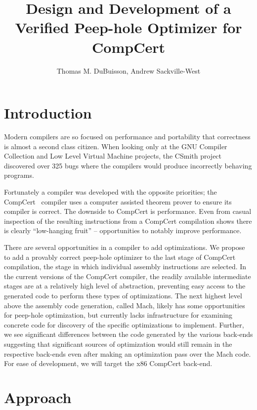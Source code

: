 \documentclass[letterpaper]{article}
\begin{document}
\title{Design and Development of a Verified Peep-hole Optimizer for CompCert}

\author{Thomas M. Du{B}uisson, Andrew Sackville-West}
\maketitle

\section{Introduction}
Modern compilers are so focused on performance and portability that
correctness is almost a second class citizen.  When looking only at
the GNU Compiler Collection and Low Level Virtual Machine projects,
the CSmith project~\cite{Yang11} discovered over 325 bugs where the
compilers would produce incorrectly behaving programs.

Fortunately a compiler was developed with the opposite priorities; the
CompCert~\cite{Leroy-backend} compiler uses a computer assisted theorem
prover to ensure its compiler is correct.  The downside to CompCert is
performance.  Even from casual inspection of the resulting
instructions from a CompCert compilation shows there is clearly
``low-hanging fruit'' -- opportunities to notably improve performance.

There are several opportunities in a compiler to add optimizations. We
propose to add a provably correct peep-hole optimizer to the last
stage of CompCert compilation, the stage in which individual assembly
instructions are selected. In the current versions of the CompCert
compiler, the readily available intermediate stages are at a
relatively high level of abstraction, preventing easy access to the
generated code to perform these types of optimizations. The next
highest level above the assembly code generation, called Mach, likely
has some opportunities for peep-hole optimization, but currently lacks
infrastructure for examining concrete code for discovery of the
specific optimizations to implement. Further, we see significant
differences between the code generated by the various back-ends
suggesting that significant sources of optimization would still remain
in the respective back-ends even after making an optimization pass
over the Mach code. For ease of development, we will target the x86
CompCert back-end.

\section{Approach}
\end{document}
